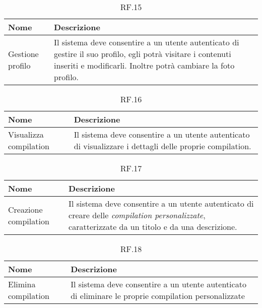 \documentclass{natourDoc}
\begin{document}
	\begin{table}[H]
		\centering
		\begin{tabular}{ |p{5cm}|p{10.3cm}| } 
			\hline
			\rowcolor{PineGreen!70}
			\textbf{Nome} & \textbf{Descrizione} \\
			\hline
			Gestione profilo &  Il sistema deve consentire a un utente autenticato di gestire il suo profilo, 
			egli potrà visitare i contenuti inseriti e modificarli. Inoltre potrà cambiare la foto profilo. \\
			\hline
		\end{tabular}
		\caption{RF.15}
		\label{table:15}
	\end{table}
	

	\begin{table}[H]
		\centering
		\begin{tabular}{ |p{5cm}|p{10.3cm}| }
			\hline
			\rowcolor{PineGreen!70}
			\textbf{Nome} & \textbf{Descrizione} \\
			\hline
			Visualizza compilation & Il sistema deve consentire a un utente autenticato di visualizzare i dettagli
			delle proprie compilation.  \\
			\hline
		\end{tabular}
		\caption{RF.16}
		\label{table:16}
	\end{table}

	\begin{table}[H]
		\centering
		\begin{tabular}{ |p{5cm}|p{10.3cm}| }
			\hline
			\rowcolor{PineGreen!70}
			\textbf{Nome} & \textbf{Descrizione} \\
			\hline
			Creazione compilation & Il sistema deve consentire a un utente autenticato di creare delle \textit{compilation personalizzate},
			caratterizzate da un titolo e da una descrizione. \\
			\hline
		\end{tabular}
		\caption{RF.17}
		\label{table:17}
	\end{table}

	\begin{table}[H]
		\centering
		\begin{tabular}{ |p{5cm}|p{10.3cm}| }
			\hline
			\rowcolor{PineGreen!70}
			\textbf{Nome} & \textbf{Descrizione} \\
			\hline
			Elimina compilation & Il sistema deve consentire a un utente autenticato di eliminare le proprie
			compilation personalizzate \\
			\hline
		\end{tabular}
		\caption{RF.18}
		\label{table:18}
	\end{table}
	
\end{document}

